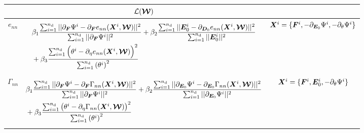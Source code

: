 \begin{table}[htbp!]
	\centering
	\begin{tabular}{c c c}
		\toprule
		\rowcolor{gray!30}	\small{} & $\mathcal{L}(\boldsymbol{\mathcal{W}})$ &\\
		\midrule
		$e_{nn}$	&	\begin{minipage}{0.65\textwidth}
			\begin{equation*}
			\begin{aligned}
			& \beta_1\frac{\sum_{i=1}^{n_{\text{d}}} \vert\vert \partial_{\boldsymbol{F}}\Psi^{i} - \partial_{\boldsymbol{F}} e_{nn}(\boldsymbol{X}^i, \boldsymbol{\mathcal{W}}) \vert\vert^2}{\sum_{i=1}^{n_{\text{d}}} \vert\vert \partial_{\boldsymbol{F}}\Psi^{i} \vert\vert^2}  + \beta_2\frac{\sum_{i=1}^{n_{\text{d}}} \vert\vert \boldsymbol{E}_0^{i} - \partial_{\boldsymbol{D}_0} e_{nn}(\boldsymbol{X}^i, \boldsymbol{\mathcal{W}}) \vert\vert^2}{\sum_{i=1}^{n_{\text{d}}} \vert\vert \boldsymbol{E}_0^{i} \vert\vert^2} \\
			& + \beta_3\frac{\sum_{i=1}^{n_{\text{d}}} \Big( \theta^{i} - \partial_{\eta} e_{nn}(\boldsymbol{X}^i, \boldsymbol{\mathcal{W}})\Big)^2 }{\sum_{i=1}^{n_{\text{d}}}  \left(\theta^{i}\right)^2 }
			\end{aligned}
			\end{equation*}
		\end{minipage}  & $\boldsymbol{X}^i=\{\boldsymbol{F}^i, -\partial_{\boldsymbol{E}_0}\Psi^i, -\partial_{\theta}\Psi^i\}$ 	\\
		$\Gamma_{nn}$	&	\begin{minipage}{0.68\textwidth}
			\begin{equation*}
			\begin{aligned}
			& \beta_1\frac{\sum_{i=1}^{n_{\text{d}}} \vert\vert \partial_{\boldsymbol{F}}\Psi^{i} - \partial_{\boldsymbol{F}} \Gamma_{nn}(\boldsymbol{X}^i, \boldsymbol{\mathcal{W}}) \vert\vert^2}{\sum_{i=1}^{n_{\text{d}}} \vert\vert\partial_{\boldsymbol{F}}\Psi^{i} \vert\vert^2}  + \beta_2\frac{\sum_{i=1}^{n_{\text{d}}} \vert\vert \partial_{\boldsymbol{E}_0}\Psi^{i} - \partial_{\boldsymbol{E}_0} \Gamma_{nn}(\boldsymbol{X}^i, \boldsymbol{\mathcal{W}}) \vert\vert^2}{\sum_{i=1}^{n_{\text{d}}} \vert\vert \partial_{\boldsymbol{E}_0}\Psi^{i} \vert\vert^2} \\
			& + \beta_3\frac{\sum_{i=1}^{n_{\text{d}}} \left( \theta^{i} - \partial_{\eta} \Gamma_{nn}(\boldsymbol{X}^i, \boldsymbol{\mathcal{W}}) \right)^2}{\sum_{i=1}^{n_{\text{d}}} \left( \theta^{i} \right)^2}
			\end{aligned}
			\end{equation*}
		\end{minipage} & $\boldsymbol{X}^i=\{\boldsymbol{F}^i, \boldsymbol{E}_0^i, -\partial_{\theta}\Psi^i\}$	\\
		\midrule
		

\end{tabular}
\end{table}

